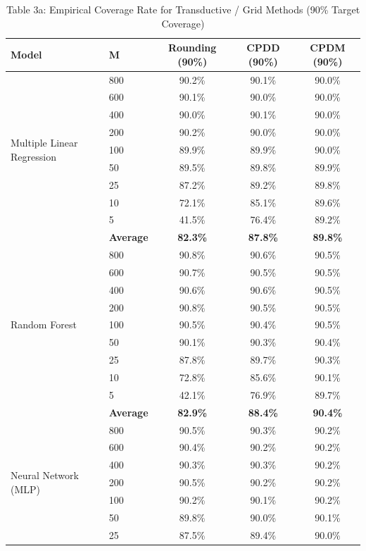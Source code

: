 \documentclass[11pt,a4paper]{article}
\begin{document}
\begin{table}[H]
\centering
\caption{Table 3a: Empirical Coverage Rate for Transductive / Grid Methods (90\% Target Coverage)}
\label{tab:3a}
\scriptsize
\begin{tabular}{llccc}
\toprule
Model & M & Rounding (90\%) & CPDD (90\%) & CPDM (90\%) \\
\midrule
\multirow{9}{*}{Multiple Linear Regression}
 & 800 & 90.2\% & 90.1\% & 90.0\% \\
 & 600 & 90.1\% & 90.0\% & 90.0\% \\
 & 400 & 90.0\% & 90.1\% & 90.0\% \\
 & 200 & 90.2\% & 90.0\% & 90.0\% \\
 & 100 & 89.9\% & 89.9\% & 90.0\% \\
 & 50  & 89.5\% & 89.8\% & 89.9\% \\
 & 25  & 87.2\% & 89.2\% & 89.8\% \\
 & 10  & 72.1\% & 85.1\% & 89.6\% \\
 & 5   & 41.5\% & 76.4\% & 89.2\% \\
 & \textbf{Average} & \textbf{82.3\%} & \textbf{87.8\%} & \textbf{89.8\%} \\
\midrule
\multirow{9}{*}{Random Forest}
 & 800 & 90.8\% & 90.6\% & 90.5\% \\
 & 600 & 90.7\% & 90.5\% & 90.5\% \\
 & 400 & 90.6\% & 90.6\% & 90.5\% \\
 & 200 & 90.8\% & 90.5\% & 90.5\% \\
 & 100 & 90.5\% & 90.4\% & 90.5\% \\
 & 50  & 90.1\% & 90.3\% & 90.4\% \\
 & 25  & 87.8\% & 89.7\% & 90.3\% \\
 & 10  & 72.8\% & 85.6\% & 90.1\% \\
 & 5   & 42.1\% & 76.9\% & 89.7\% \\
 & \textbf{Average} & \textbf{82.9\%} & \textbf{88.4\%} & \textbf{90.4\%} \\
\midrule
\multirow{9}{*}{Neural Network (MLP)}
 & 800 & 90.5\% & 90.3\% & 90.2\% \\
 & 600 & 90.4\% & 90.2\% & 90.2\% \\
 & 400 & 90.3\% & 90.3\% & 90.2\% \\
 & 200 & 90.5\% & 90.2\% & 90.2\% \\
 & 100 & 90.2\% & 90.1\% & 90.2\% \\
 & 50  & 89.8\% & 90.0\% & 90.1\% \\
 & 25  & 87.5\% & 89.4\% & 90.0\% \\

\end{tabular}
\end{table}
\end{document}
